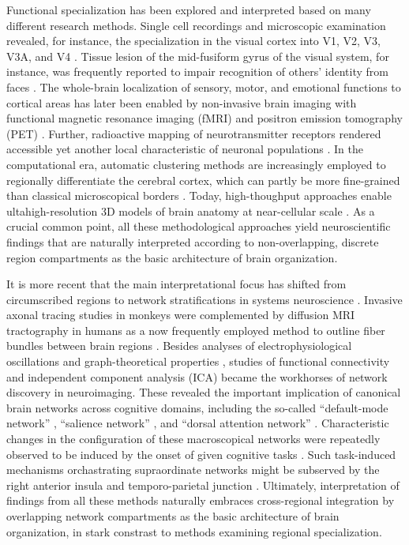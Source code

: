 \documentclass{article} %
\begin{document}
Functional specialization has been
explored and interpreted based on many different research methods.
%
Single cell recordings and microscopic examination
revealed, for instance, the
specialization in the visual cortex into V1, V2, V3, V3A, and V4
\cite{hubel1962receptive, zeki1978functional}.
Tissue lesion of the mid-fusiform gyrus of the visual system,
for instance,
was frequently reported to impair
recognition of others' identity from faces
\cite{iaria2008contrib}.
The whole-brain localization of
sensory, motor, and emotional functions to cortical areas
has later been enabled by
non-invasive brain imaging with
functional magnetic resonance imaging (fMRI) and
positron emission tomography (PET)
\cite{fristen1997imaging}.
Further,
radioactive mapping of neurotransmitter receptors
rendered accessible yet another
local characteristic of neuronal populations
\cite{zilles2009receptor}.
In the computational era,
automatic clustering methods are increasingly employed to
regionally differentiate the cerebral cortex,
which can partly be more fine-grained than
classical microscopical borders
\cite{behrens03, cbp2015review}.
Today,
high-thoughput approaches enable
ultahigh-resolution 3D models of brain anatomy
at near-cellular scale
\cite{amunts2013bigbrain}.
%
As a crucial common point,
all these methodological approaches
yield neuroscientific findings
that are naturally interpreted according to
non-overlapping, discrete region compartments
as the basic architecture of brain organization.



It is more recent
that the main interpretational focus has shifted
from circumscribed regions to network stratifications
in systems neuroscience \cite{yuste2015, stephan_dys}.
%
Invasive axonal tracing studies in monkeys were complemented
by diffusion MRI tractography in humans
as a now frequently employed method to
outline fiber bundles between brain regions
\cite{jbabdi2013long}.
Besides analyses of
electrophysiological oscillations
\cite{buzsaki2004neuronal}
and
graph-theoretical properties \cite{bullmore2009complex},
studies of
functional connectivity \cite{buckner2013opportunities} and
independent component analysis (ICA) \cite{beckmann2005}
became the workhorses of network discovery
in neuroimaging.
These revealed the important implication of
canonical brain networks across cognitive domains,
including the so-called
``default-mode network'' \cite{raichle2001pnas},
``salience network'' \cite{seeley2007dissociable},
and ``dorsal attention network'' \cite{corbettashul2008}. 
Characteristic changes in the configuration of
these macroscopical networks
were repeatedly observed to be induced
by the onset of given cognitive tasks \cite{fransson2006}.
Such task-induced mechanisms orchastrating supraordinate networks
might be subserved by the right anterior insula \cite{sridh2008}
and temporo-parietal junction \cite{bzdok2013tpj}.
%
Ultimately,
interpretation of findings from all these methods naturally embraces
cross-regional integration by
overlapping network compartments
as the basic architecture of brain organization,
in stark constrast to methods examining regional specialization.
\end{document}
